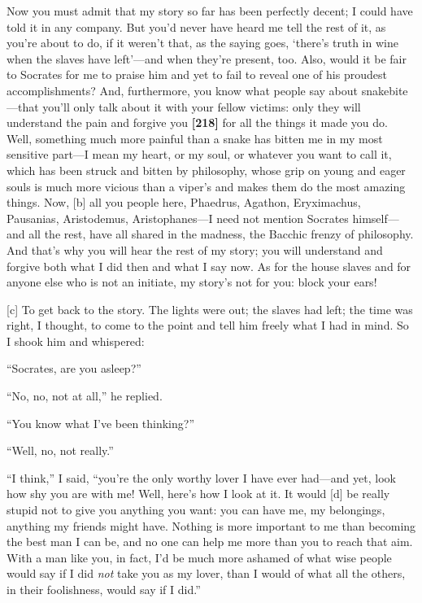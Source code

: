 Now you must admit that my story so far has been perfectly decent; I
could have told it in any company. But you'd never have heard me tell
the rest of it, as you're about to do, if it weren't that, as the saying
goes, ‘there's truth in wine when the slaves have left'---and when
they're present, too. Also, would it be fair to Socrates for me to
praise him and yet to fail to reveal one of his proudest
accomplishments? And, furthermore, you know what people say about
snakebite---that you'll only talk about it with your fellow victims:
only they will understand the pain and forgive you {\bf {[}218{]}} for
all the things it made you do. Well, something much more painful than a
snake has bitten me in my most sensitive part---I mean my heart, or my
soul, or whatever you want to call it, which has been struck and bitten
by philosophy, whose grip on young and eager souls is much more vicious
than a viper's and makes them do the most amazing things. Now, {[}b{]}
all you people here, Phaedrus, Agathon, Eryximachus, Pausanias,
Aristodemus, Aristophanes---I need not mention Socrates himself---and
all the rest, have all shared in the madness, the Bacchic frenzy of
philosophy. And that's why you will hear the rest of my story; you will
understand and forgive both what I did then and what I say now. As for
the house slaves and for anyone else who is not an initiate, my story's
not for you: block your ears!

{[}c{]} To get back to the story. The lights were out; the slaves had
left; the time was right, I thought, to come to the point and tell him
freely what I had in mind. So I shook him and whispered:

“Socrates, are you asleep?”

“No, no, not at all,” he replied.

“You know what I've been thinking?”

“Well, no, not really.”

“I think,” I said, “you're the only worthy lover I have ever had---and
yet, look how shy you are with me! Well, here's how I look at it. It
would {[}d{]} be really stupid not to give you anything you want: you
can have me, my belongings, anything my friends might have. Nothing is
more important to me than becoming the best man I can be, and no one can
help me more than you to reach that aim. With a man like you, in fact,
I'd be much more ashamed of what wise people would say if I did
{\em not} take you as my lover, than I would of what all the others, in
their foolishness, would say if I did.”


